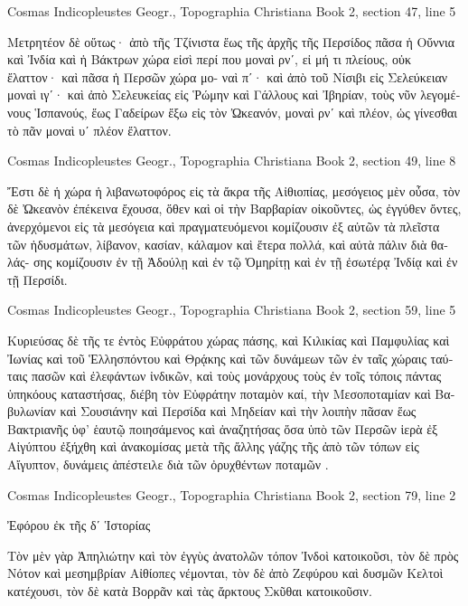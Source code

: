 \documentclass[12pt,letterpaper,twoside,final]{memoir}
\begin{document}
\begin{greek}
Cosmas Indicopleustes Geogr., Topographia Christiana 
Book 2, section 47, line 5

                                                       Μετρητέον δὲ 
οὕτως· ἀπὸ τῆς Τζίνιστα ἕως τῆς ἀρχῆς τῆς Περσίδος πᾶσα ἡ 
Οὔννια καὶ Ἰνδία καὶ ἡ Βάκτρων χώρα εἰσὶ περί που μοναὶ ρνʹ, 
εἰ μή τι πλείους, οὐκ ἔλαττον· καὶ πᾶσα ἡ Περσῶν χώρα μο-
ναὶ πʹ· καὶ ἀπὸ τοῦ Νίσιβι εἰς Σελεύκειαν μοναὶ ιγʹ· καὶ ἀπὸ 
Σελευκείας εἰς Ῥώμην καὶ Γάλλους καὶ Ἰβηρίαν, τοὺς νῦν 
λεγομένους Ἱσπανούς, ἕως Γαδείρων ἔξω εἰς τὸν Ὠκεανόν, 
μοναὶ ρνʹ καὶ πλέον, ὡς γίνεσθαι τὸ πᾶν μοναὶ υʹ πλέον 
ἔλαττον. 



Cosmas Indicopleustes Geogr., Topographia Christiana 
Book 2, section 49, line 8

Ἔστι δὲ ἡ χώρα ἡ λιβανωτοφόρος εἰς τὰ ἄκρα τῆς 
Αἰθιοπίας, μεσόγειος μὲν οὖσα, τὸν δὲ Ὠκεανὸν ἐπέκεινα   
ἔχουσα, ὅθεν καὶ οἱ τὴν Βαρβαρίαν οἰκοῦντες, ὡς ἐγγύθεν 
ὄντες, ἀνερχόμενοι εἰς τὰ μεσόγεια καὶ πραγματευόμενοι 
κομίζουσιν ἐξ αὐτῶν τὰ πλεῖστα τῶν ἡδυσμάτων, λίβανον, 
κασίαν, κάλαμον καὶ ἕτερα πολλά, καὶ αὐτὰ πάλιν διὰ θαλάς-
σης κομίζουσιν ἐν τῇ Ἀδούλῃ καὶ ἐν τῷ Ὁμηρίτῃ καὶ ἐν τῇ 
ἐσωτέρᾳ Ἰνδίᾳ καὶ ἐν τῇ Περσίδι. 



Cosmas Indicopleustes Geogr., Topographia Christiana 
Book 2, section 59, line 5

   Κυριεύσας δὲ τῆς τε 
ἐντὸς Εὐφράτου χώρας πάσης, καὶ Κιλικίας καὶ Παμφυλίας 
καὶ Ἰωνίας καὶ τοῦ Ἑλλησπόντου καὶ Θρᾴκης καὶ τῶν 
δυνάμεων τῶν ἐν ταῖς χώραις ταύταις πασῶν καὶ ἐλεφάντων 
ἰνδικῶν, καὶ τοὺς μονάρχους τοὺς ἐν τοῖς τόποις πάντας 
ὑπηκόους καταστήσας, διέβη τὸν Εὐφράτην ποταμὸν καί, 
τὴν Μεσοποταμίαν καὶ Βαβυλωνίαν καὶ Σουσιάνην καὶ 
Περσίδα καὶ Μηδείαν καὶ τὴν λοιπὴν πᾶσαν ἕως Βακτριανῆς 
ὑφ' ἑαυτῷ ποιησάμενος καὶ ἀναζητήσας ὅσα ὑπὸ τῶν Περσῶν 
ἱερὰ ἐξ Αἰγύπτου ἐξήχθη καὶ ἀνακομίσας μετὰ τῆς ἄλλης 
γάζης τῆς ἀπὸ τῶν τόπων εἰς Αἴγυπτον, δυνάμεις ἀπέστειλε 
διὰ τῶν ὀρυχθέντων ποταμῶν . 



Cosmas Indicopleustes Geogr., Topographia Christiana 
Book 2, section 79, line 2

Ἐφόρου ἐκ τῆς δʹ Ἱστορίας


 Τὸν μὲν γὰρ Ἀπηλιώτην καὶ τὸν ἐγγὺς ἀνατολῶν 
τόπον Ἰνδοὶ κατοικοῦσι, τὸν δὲ πρὸς Νότον καὶ μεσημβρίαν 
Αἰθίοπες νέμονται, τὸν δὲ ἀπὸ Ζεφύρου καὶ δυσμῶν Κελτοὶ 
κατέχουσι, τὸν δὲ κατὰ Βορρᾶν καὶ τὰς ἄρκτους Σκῦθαι 
κατοικοῦσιν. 




\end{greek}
\end{document}
